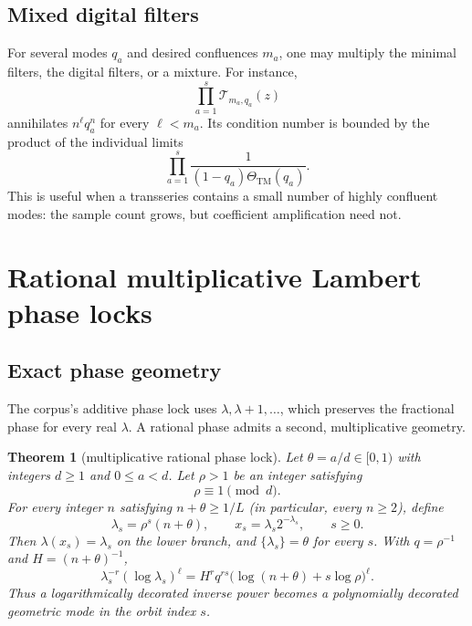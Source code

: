 \documentclass[11pt,oneside]{article}
\numberwithin{equation}{section}
\newtheorem{theorem}{Theorem}[section]
\theoremstyle{definition}
\theoremstyle{remark}
\newcommand{\ThetaTM}{\Theta_{\!\mathrm{TM}}}
\begin{document}
\subsection{Mixed digital filters}

For several modes $q_a$ and desired confluences $m_a$, one may multiply the minimal
filters, the digital filters, or a mixture.  For instance,
\begin{equation}
 \prod_{a=1}^{s}\mathcal T_{m_a,q_a}(z)
 \label{eq:mixed-digital-filter}
\end{equation}
annihilates $n^\ell q_a^n$ for every $\ell<m_a$.  Its condition number is bounded by the
product of the individual limits
\[
 \prod_{a=1}^{s}\frac{1}{(1-q_a)\ThetaTM(q_a)}.
\]
This is useful when a transseries contains a small number of highly confluent modes: the
sample count grows, but coefficient amplification need not.

\section{Rational multiplicative Lambert phase locks}
\label{sec:phase-lock}

\subsection{Exact phase geometry}

The corpus's additive phase lock uses $\lambda,\lambda+1,\ldots$, which preserves the
fractional phase for every real $\lambda$.  A rational phase admits a second, multiplicative
geometry.

\begin{theorem}[multiplicative rational phase lock]
\label{thm:multiplicative-lock}
Let $\theta=a/d\in[0,1)$ with integers $d\ge1$ and $0\le a<d$.  Let $\rho>1$ be an
integer satisfying
\begin{equation}
 \rho\equiv1\pmod d.
 \label{eq:rho-congruence}
\end{equation}
For every integer $n$ satisfying $n+\theta\ge1/L$ (in particular, every $n\ge2$), define
\begin{equation}
 \lambda_s=\rho^s(n+\theta),
 \qquad
 x_s=\lambda_s2^{-\lambda_s},
 \qquad s\ge0.
 \label{eq:multiplicative-lambda-orbit}
\end{equation}
Then $\lambda(x_s)=\lambda_s$ on the lower branch, and
$\{\lambda_s\}=\theta$ for every $s$.  With $q=\rho^{-1}$ and
$H=(n+\theta)^{-1}$,
\begin{equation}
 \lambda_s^{-r}(\log\lambda_s)^\ell
 =H^rq^{rs}\bigl(\log(n+\theta)+s\log\rho\bigr)^\ell.
 \label{eq:decorated-mode-orbit}
\end{equation}
Thus a logarithmically decorated inverse power becomes a polynomially decorated geometric
mode in the orbit index $s$.
\end{theorem}
\end{document}

